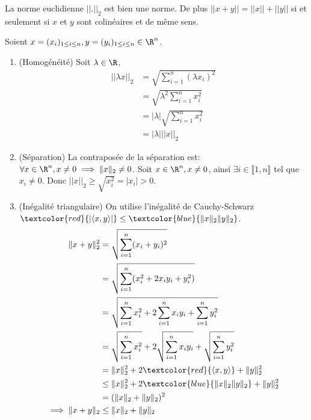 \documentclass[a4paper, 12pt]{article}
\begin{document}
\begin{proposition}{}{}
    La norme euclidienne $||.||_2$ est bien une norme.\n
    De plus $||x + y|| = ||x|| + ||y||$ si et seulement si $x$ et $y$ sont colinéaires et de même sens.
\end{proposition}

\begin{demonstration}
    Soient $x = (x_i)_{1\leq i \leq n}, y = (y_i)_{1\leq i \leq n} \in \R^n$.

    \begin{enumerate}
        \item (Homogénéité)
        Soit $\lambda \in \R$, 
        \begin{align*}
            ||\lambda x ||_2 &= \sqrt{\sum_{i=1}^n (\lambda x_i)^2}\\
            &= \sqrt{\lambda^2 \sum_{i=1}^n x_i^2}\\
            &= |\lambda| \sqrt{\sum_{i=1}^n x_i^2}\\
            &= |\lambda| ||x||_2
        \end{align*}
        \item (Séparation)\n
        La contraposée de la séparation est: $\forall x \in \R^n, x \neq 0 \implies \|x\|_2 \neq 0$.\n
        Soit $x \in \R^n, x \neq 0$, ainsi $\exists i \in \llbracket 1, n \rrbracket$ tel que $x_i \neq 0$.\n
        Donc $||x||_2 \geq \sqrt{x_i^2} = |x_i| \gt 0$.
        \item (Inégalité triangulaire)\n
        On utilise l'inégalité de Cauchy-Schwarz $\textcolor{red}{|\langle x,y \rangle|} \leq \textcolor{blue}{\|x\|_2\|y\|_2}$.\n
        \begin{align*}
            \|x + y\|_2^2 &= \sqrt{\sum_{i=1}^n (x_i + y_i)^2}\\
            &= \sqrt{\sum_{i=1}^n (x_i^2 + 2x_iy_i + y_i^2)}\\
            &=\sqrt{\sum_{i=1}^n x_i^2 + 2\sum_{i=1}^n x_iy_i + \sum_{i=1}^n y_i^2}\\
            &=\sqrt{\sum_{i=1}^n x_i^2} + 2\sqrt{\sum_{i=1}^n x_iy_i} + \sqrt{\sum_{i=1}^n y_i^2}\\
            &= \|x\|_2^2 + 2\textcolor{red}{\langle x, y \rangle} + \|y\|_2^2\\
            &\leq \|x\|_2^2 + 2\textcolor{blue}{\|x\|_2\|y\|_2} + \|y\|_2^2\\
            &= (\|x\|_2 + \|y\|_2)^2\\
            \implies \|x + y\|_2 &\leq \|x\|_2 + \|y\|_2
        \end{align*}
    \end{enumerate}
\end{demonstration}
\end{document}
